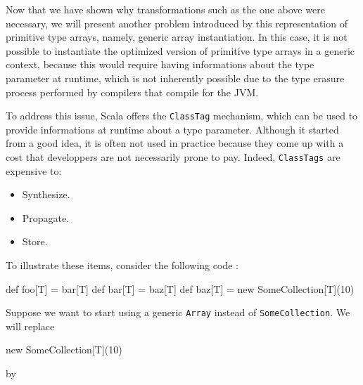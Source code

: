 
Now that we have shown why transformations such as the one above were necessary, we will present another problem introduced by this representation of primitive type arrays, namely, generic array instantiation. In this case, it is not possible to instantiate the optimized version of primitive type arrays in a generic context, because this would require having informations about the type parameter at runtime, which is not inherently possible due to the type erasure process performed by compilers that compile for the JVM.


To address this issue, Scala offers the \lstinline|ClassTag| mechanism, which can be used to provide informations at runtime about a type parameter. Although it started from a good idea, it is often not used in practice because they come up with a cost that developpers are not necessarily prone to pay. Indeed, \lstinline|ClassTags| are expensive to:


\begin{itemize}
  \item Synthesize.
  \item Propagate.
  \item Store.
\end{itemize}

To illustrate these items, consider the following code :

\begin{lstlisting-nobreak}
  def foo[T] = bar[T]
  def bar[T] = baz[T]
  def baz[T] = new SomeCollection[T](10)
\end{lstlisting-nobreak}

Suppose we want to start using a generic \lstinline|Array| instead of \lstinline|SomeCollection|. We will replace

\begin{lstlisting-nobreak}
  new SomeCollection[T](10)
\end{lstlisting-nobreak}

by

